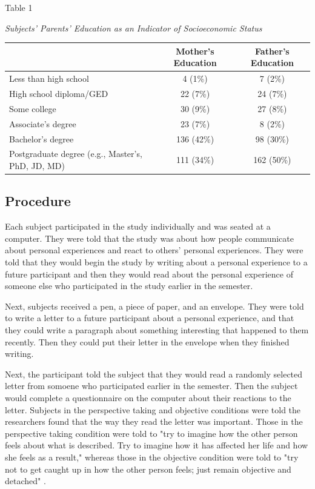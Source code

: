 \documentclass[man,a4paper,noextraspace,apacite]{apa6}
\begin{document}
\begin{table}
  Table 1
  
  \textit{Subjects' Parents' Education as an Indicator of Socioeconomic Status}

  \begin{tabular}{l c c}
     \hline
     & Mother's Education & Father's Education \\
     \hline
     Less than high school & 
        4 (1\%) & 
        7 (2\%) \\
     High school diploma/GED & 
        22 (7\%) & 
        24 (7\%) \\
     Some college & 
        30 (9\%) & 
        27 (8\%) \\
     Associate's degree & 
        23 (7\%) & 
        8 (2\%) \\
     Bachelor's degree & 
        136 (42\%) & 
        98 (30\%) \\
     Postgraduate degree (e.g., Master's, PhD, JD, MD) & 
        111 (34\%) & 
        162 (50\%) \\
     \hline
  \end{tabular}

\end{table}

\subsection{Procedure}
Each subject participated in the study individually and was seated at a computer. They were told that the study was about how people communicate about personal experiences and react to others' personal experiences. They were told that they would begin the study by writing about a personal experience to a future participant and then they would read about the personal experience of someone else who participated in the study earlier in the semester.

Next, subjects received a pen, a piece of paper, and an envelope. They were told to write a letter to a future participant about a personal experience, and that they could write a paragraph about something interesting that happened to them recently. Then they could put their letter in the envelope when they finished writing. 

Next, the participant told the subject that they would read a randomly selected letter from somoene who participated earlier in the semester. Then the subject would complete a questionnaire on the computer about their reactions to the letter. Subjects in the perspective taking and objective conditions were told the researchers found that the way they read the letter was important. Those in the perspective taking condition were told to "try to imagine how the other person feels about what is described. Try to imagine how it has affected her life and how she feels as a result," whereas those in the objective condition were told to "try not to get caught up in how the other person feels; just remain objective and detached" \cite{Batson2002, Batson2007}.
\end{document}
